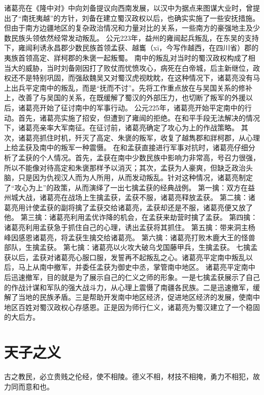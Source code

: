 \documentclass[a4paper,12pt,UTF8,twoside]{ctexbook}
\begin{document}
诸葛亮在《隆中对》中向刘备提议向西南发展，以汉中为据点来图谋大业时，曾提出了“南抚夷越”的方针，刘备在建立蜀汉政权以后，也确实实施了一些安抚措施。但由于南方边疆地区的复杂政治情况和力量对比的关系，一些南方的豪强地主及少数民族头领依然经常发动叛乱。
公元223年，益州的雍闿起兵叛乱，在东吴的支持下，雍闿利诱永昌郡少数民族首领孟获、越巂（xī，今写作越西，在四川省）郡的夷族首领高定、牂柯郡的朱褒一起叛蜀。
南中的叛乱对当时的蜀汉政权构成了相当大的威胁，当时刘备刚因打了败仗而忧愤攻心，病死在白帝城，后主新继位，政权还不是特别巩固，而强敌魏吴又对蜀汉虎视眈眈，在这种情况下，诸葛亮没有马上出兵平定南中的叛乱，而是“抚而不讨”。先将工作重点放在与吴国关系的修补上，改善了与吴国的关系，在既缓解了蜀汉的外部压力，也切断了叛军的外援以后，诸葛亮开始了征讨南中的军事行动。
公元225年，诸葛亮开始平定南中的行动。首先，诸葛亮实施了招安，但遭到了雍闿的拒绝。在和平手段无法解决的情况下，诸葛亮亲率大军南征。在征讨前，诸葛亮确定了攻心为上的作战策略。
其次，诸葛亮抓住时机，歼灭了高定、朱褒的叛军，收复了越雋郡和牂柯郡，从心理上给孟获及南中的叛军一种震慑。
在和孟获直接进行军事对抗时，诸葛亮仔细分析了孟获的个人情况。首先，孟获在南中少数民族中影响力非常高，号召力很强，所以不能像对待高定和朱褒那样予以消灭；其次，孟获为人豪爽，但缺乏政治头脑，只是因为仇视汉人而为人所用，从而发动叛乱。针对这种情况，诸葛亮制定了“攻心为上”的政策，从而演绎了一出七擒孟获的经典战例。
第一擒：双方在益州城大战，诸葛亮在战场上生擒孟获，孟获不服，诸葛亮释放孟获。
第二擒：诸葛亮用计使孟获的副将擒了孟获交给诸葛亮，孟获却还是不服，诸葛亮便又放了他。
第三擒：诸葛亮利用孟优诈降的机会，在孟获来劫营时擒了孟获。
第四擒：诸葛亮利用孟获急于抓住自己的心理，诱出孟获将其抓住。
第五擒：带来洞主杨峰因感恩诸葛亮，将孟获生擒交给诸葛亮。
第六擒：诸葛亮打败木鹿大王的怪兽部队，生擒孟获。
第七擒：诸葛亮以火攻大破乌戈国藤甲兵，生擒孟获。
七擒孟获以后，孟获对诸葛亮心服口服，发誓再不起叛乱之心。诸葛亮平定南中叛乱以后，马上从南中撤军，并委任孟获为御史中丞，掌管南中地区。
诸葛亮平定南中后迅速撤军，目的就是为了展示自己的仁义之师的形象。一是七擒孟获展示了自己的作战计谋和军队的强大战斗力，从心理上震慑了南疆各民族。二是迅速撤军，缓解了当地的民族矛盾。三是帮助开发南中地区经济，促进地区经济的发展，使南中地区百姓对蜀汉政权心存感恩。正是因为师行仁义，诸葛亮为蜀汉建立了一个稳固的大后方。


\chapter{天子之义}

古之教民，必立贵贱之伦经，使不相陵。德义不相，材技不相掩，勇力不相犯，故力同而意和也。
\end{document}
